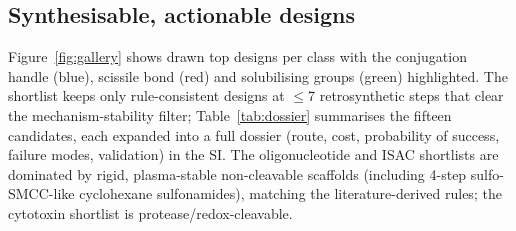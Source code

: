 \documentclass[10pt]{article}
\begin{document}
\subsection{Synthesisable, actionable designs}
Figure~\ref{fig:gallery} shows drawn top designs per class with the conjugation handle (blue), scissile bond (red) and solubilising groups (green) highlighted. The shortlist keeps only rule-consistent designs at $\le$7 retrosynthetic steps that clear the mechanism-stability filter; Table~\ref{tab:dossier} summarises the fifteen candidates, each expanded into a full dossier (route, cost, probability of success, failure modes, validation) in the SI. The oligonucleotide and ISAC shortlists are dominated by rigid, plasma-stable non-cleavable scaffolds (including 4-step sulfo-SMCC-like cyclohexane sulfonamides), matching the literature-derived rules; the cytotoxin shortlist is protease/redox-cleavable.
\end{document}

